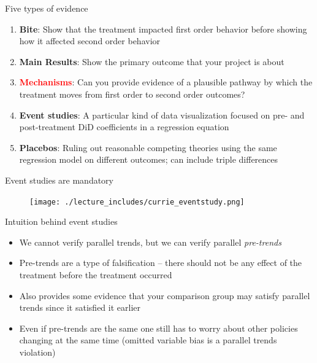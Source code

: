 \documentclass{beamer}
\begin{document}
\begin{frame}{Five types of evidence}

\begin{enumerate}
\item \textbf{Bite}: Show that the treatment impacted first order behavior before showing how it affected second order behavior
\item \textbf{Main Results}: Show the primary outcome that your project is about
\item \textcolor{red}{\textbf{Mechanisms}}: Can you provide evidence of a plausible pathway by which the treatment moves from first order to second order outcomes?
\item \textbf{Event studies}: A particular kind of data visualization focused on pre- and post-treatment DiD coefficients in a regression equation
\item \textbf{Placebos}: Ruling out reasonable competing theories using the same regression model on different outcomes; can include triple differences
\end{enumerate}

\end{frame}


\begin{frame}{Event studies are mandatory}

	\begin{figure}
	\texttt{[image: ./lecture\_includes/currie\_eventstudy.png]}
	\end{figure}

\end{frame}

\begin{frame}{Intuition behind event studies}

\begin{itemize}
	\item We cannot verify parallel trends, but we can verify parallel \emph{pre-trends} 
	\item Pre-trends are a type of falsification -- there should not be any effect of the treatment before the treatment occurred
	\item Also provides some evidence that your comparison group may satisfy parallel trends since it satisfied it earlier
	\item Even if pre-trends are the same one still has to worry about other policies changing at the same time (omitted variable bias is a parallel trends violation)

\end{itemize}

\end{frame}
\end{document}
